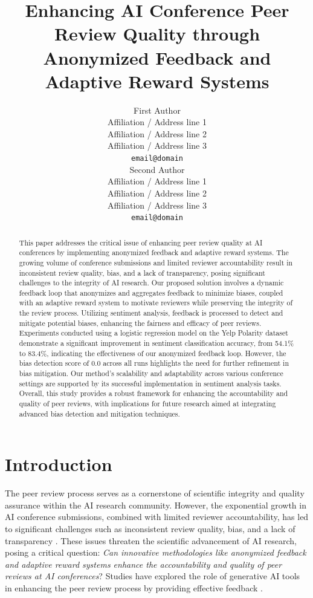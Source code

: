 \documentclass[11pt]{article}
\title{Enhancing AI Conference Peer Review Quality through Anonymized Feedback and Adaptive Reward Systems}
\author{First Author \\
  Affiliation / Address line 1 \\
  Affiliation / Address line 2 \\
  Affiliation / Address line 3 \\
  \texttt{email@domain} \\\And
  Second Author \\
  Affiliation / Address line 1 \\
  Affiliation / Address line 2 \\
  Affiliation / Address line 3 \\
  \texttt{email@domain} \\}
\begin{document}
\maketitle
\begin{abstract}
This paper addresses the critical issue of enhancing peer review quality at AI conferences by implementing anonymized feedback and adaptive reward systems. The growing volume of conference submissions and limited reviewer accountability result in inconsistent review quality, bias, and a lack of transparency, posing significant challenges to the integrity of AI research. Our proposed solution involves a dynamic feedback loop that anonymizes and aggregates feedback to minimize biases, coupled with an adaptive reward system to motivate reviewers while preserving the integrity of the review process. Utilizing sentiment analysis, feedback is processed to detect and mitigate potential biases, enhancing the fairness and efficacy of peer reviews. Experiments conducted using a logistic regression model on the Yelp Polarity dataset demonstrate a significant improvement in sentiment classification accuracy, from 54.1\% to 83.4\%, indicating the effectiveness of our anonymized feedback loop. However, the bias detection score of 0.0 across all runs highlights the need for further refinement in bias mitigation. Our method's scalability and adaptability across various conference settings are supported by its successful implementation in sentiment analysis tasks. Overall, this study provides a robust framework for enhancing the accountability and quality of peer reviews, with implications for future research aimed at integrating advanced bias detection and mitigation techniques.
\end{abstract}


\section{Introduction}

The peer review process serves as a cornerstone of scientific integrity and quality assurance within the AI research community. However, the exponential growth in AI conference submissions, combined with limited reviewer accountability, has led to significant challenges such as inconsistent review quality, bias, and a lack of transparency \citep{sentiment2020,general2013,will2025}. These issues threaten the scientific advancement of AI research, posing a critical question: \textit{Can innovative methodologies like anonymized feedback and adaptive reward systems enhance the accountability and quality of peer reviews at AI conferences}? Studies have explored the role of generative AI tools in enhancing the peer review process by providing effective feedback \citep{generative2025,from2025}.
\end{document}
